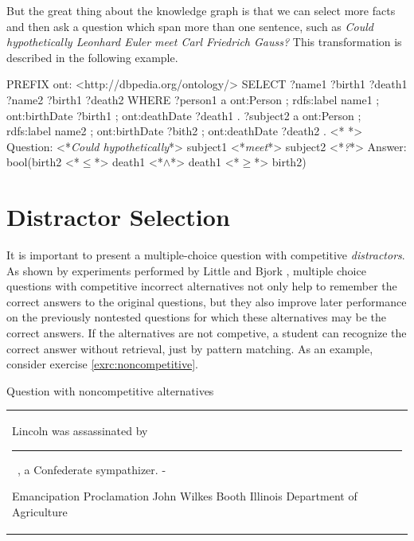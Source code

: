\documentclass[a4paper, 12pt, twoside]{fithesis2}		%
\renewcommand{\_}{\leavevmode \kern0.07em\vbox{\hrule width0.4em}}
\newcommand{\arrowlinesplit}{%
  \noindent\makebox[\linewidth]{\raisebox{0.15em}{\rule{0.478\textwidth}{0.5pt}}%
  ~$\downarrow$~%
  \noindent\raisebox{0.15em}{\rule{0.478\textwidth}{0.5pt}}}%
}
\newcounter{choice}
\renewcommand\thechoice{\Alph{choice}}
\newcommand\choicelabel{\thechoice.}
\newenvironment{choices}%
  {\vspace{0.8em}\list{\choicelabel}%
     {\usecounter{choice}\def\makelabel##1{\hss\llap{##1}}%
       \settowidth{\leftmargin}{W.\hskip\labelsep\hskip 0.01em}%
       \def\choice{%
         \item
       } %
       \labelwidth\leftmargin\advance\labelwidth-\labelsep
       \topsep=0pt
       \partopsep=0pt
     }%
  }%
  {\vspace{-0.7em}\endlist}
\newenvironment{question}
{
  \begin{center}
  \vspace{-0.5em}
  \begin{tabular}{p{0.9\textwidth}}
}
{
  \\
  \end{tabular}
  \vspace{-1em}
  \end{center}
}
\newcommand{\sentenceGap}{\rule{1.5cm}{0.4pt}~}
\begin{document}
\noindent
But the great thing about the knowledge graph is that we can select more facts and then ask a question which span more than one sentence, such as
\textit{Could hypothetically Leonhard Euler meet Carl Friedrich Gauss?}
This transformation is described in the following example.
\begin{code}
PREFIX ont: <http://dbpedia.org/ontology/>
SELECT ?name1 ?birth1 ?death1 ?name2 ?birth1 ?death2
WHERE {
  ?person1 a ont:Person ;
      rdfs:label name1 ;
      ont:birthDate ?birth1 ;
      ont:deathDate ?death1 .
  ?subject2 a ont:Person ;
      rdfs:label name2 ;
      ont:birthDate ?bith2 ;
      ont:deathDate ?death2 .
}
<*\arrowlinesplit*>
Question: <*\emph{Could hypothetically}*> subject1 <*\emph{meet}*> subject2 <*\emph{?}*>
Answer: bool(birth2 <*$\leq$*> death1 <*$\land$*> death1 <*$\geq$*> birth2)
\end{code}


\section{Distractor Selection}
\label{sec:distractors}

It is important to present a multiple-choice question with competitive \textit{distractors}.
As shown by experiments performed by Little and Bjork \cite{optimizing-multiple-choice}, multiple choice questions with competitive incorrect alternatives not only help to remember the correct answers to the original questions, but they also improve later performance on the previously nontested questions for which these alternatives may be the correct answers. If the alternatives are not competive, a student can recognize the correct answer without retrieval, just by pattern matching.
As an example, consider exercise \ref{exrc:noncompetitive}.
\begin{exercise}
\caption{Question with noncompetitive alternatives}\label{exrc:noncompetitive}
  \begin{question}
  Lincoln was assassinated by \sentenceGap , a Confederate sympathizer.
  \begin{choices}
    \choice Emancipation Proclamation
    \choice John Wilkes Booth
    \choice Illinois
    \choice Department of Agriculture
  \end{choices}
  \end{question}
\end{exercise}
\end{document}

